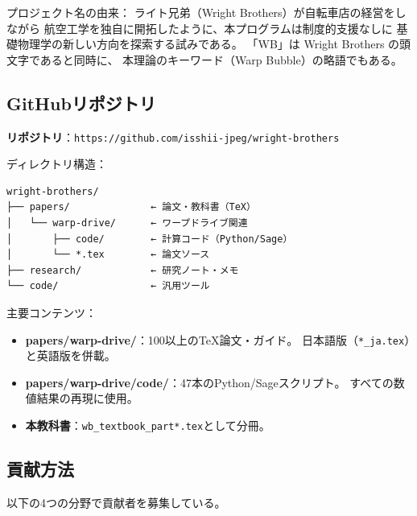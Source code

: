 \noindent
プロジェクト名の由来：
ライト兄弟（Wright Brothers）が自転車店の経営をしながら
航空工学を独自に開拓したように、本プログラムは制度的支援なしに
基礎物理学の新しい方向を探索する試みである。
「WB」は Wright Brothers の頭文字であると同時に、
本理論のキーワード（Warp Bubble）の略語でもある。


\subsection{GitHubリポジトリ}
\label{sec:16.2}

\begin{tcolorbox}[colback=gray!5!white, colframe=gray!60!black]
\textbf{リポジトリ}：\texttt{https://github.com/isshii-jpeg/wright-brothers}
\end{tcolorbox}

\noindent
ディレクトリ構造：

\begin{verbatim}
wright-brothers/
├── papers/              ← 論文・教科書（TeX）
│   └── warp-drive/      ← ワープドライブ関連
│       ├── code/        ← 計算コード（Python/Sage）
│       └── *.tex        ← 論文ソース
├── research/            ← 研究ノート・メモ
└── code/                ← 汎用ツール
\end{verbatim}

\noindent
主要コンテンツ：
\begin{itemize}
\item \textbf{papers/warp-drive/}：100以上のTeX論文・ガイド。
日本語版（\texttt{*\_ja.tex}）と英語版を併載。
\item \textbf{papers/warp-drive/code/}：47本のPython/Sageスクリプト。
すべての数値結果の再現に使用。
\item \textbf{本教科書}：\texttt{wb\_textbook\_part*.tex}として分冊。
\end{itemize}


\subsection{貢献方法}
\label{sec:16.3}

以下の4つの分野で貢献者を募集している。


